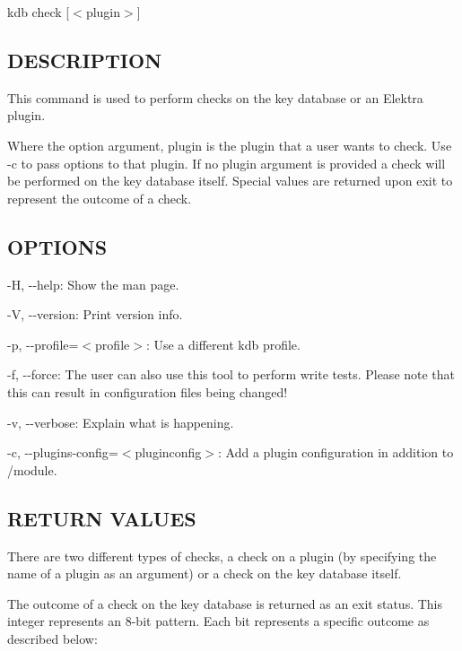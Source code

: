 {\ttfamily kdb check \mbox{[}$<$plugin$>$\mbox{]}}

\subsection*{D\+E\+S\+C\+R\+I\+P\+T\+I\+O\+N}

This command is used to perform checks on the key database or an Elektra plugin.

Where the option argument, {\ttfamily plugin} is the plugin that a user wants to check. Use {\ttfamily -\/c} to pass options to that plugin. If no {\ttfamily plugin} argument is provided a check will be performed on the key database itself. Special values are returned upon exit to represent the outcome of a check.

\subsection*{O\+P\+T\+I\+O\+N\+S}


\begin{DoxyItemize}
\item {\ttfamily -\/\+H}, {\ttfamily -\/-\/help}\+: Show the man page.
\item {\ttfamily -\/\+V}, {\ttfamily -\/-\/version}\+: Print version info.
\item {\ttfamily -\/p}, {\ttfamily -\/-\/profile}=$<$profile$>$\+: Use a different kdb profile.
\item {\ttfamily -\/f}, {\ttfamily -\/-\/force}\+: The user can also use this tool to perform write tests. Please note that this can result in configuration files being changed!
\item {\ttfamily -\/v}, {\ttfamily -\/-\/verbose}\+: Explain what is happening.
\item {\ttfamily -\/c}, {\ttfamily -\/-\/plugins-\/config}=$<$pluginconfig$>$\+: Add a plugin configuration in addition to {\ttfamily /module}.
\end{DoxyItemize}

\subsection*{R\+E\+T\+U\+R\+N V\+A\+L\+U\+E\+S}

There are two different types of checks, a check on a plugin (by specifying the name of a plugin as an argument) or a check on the key database itself.

The outcome of a check on the key database is returned as an exit status. This integer represents an 8-\/bit pattern. Each bit represents a specific outcome as described below\+:


